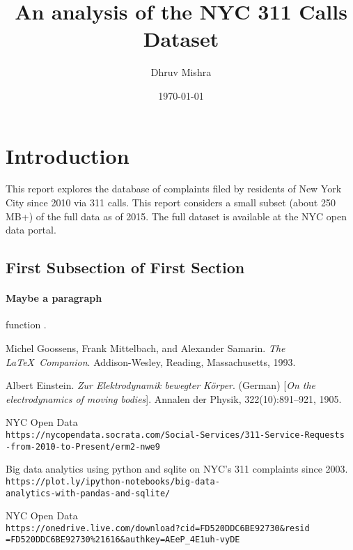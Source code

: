 \documentclass[12pt,a4paper]{article}
\begin{document}
\title{An analysis of the NYC 311 Calls Dataset}
\author{Dhruv Mishra}
\date{\today}

\maketitle


\vspace{+10mm}
\tableofcontents


\vspace{+10mm}
\section{Introduction}
This report explores the database of complaints filed by residents of New York City since 2010 via 311 calls. This report considers a small subset (about 250 MB+) of the full data as of 2015. The full dataset is available at the NYC open data portal\cite{nycdatafull}.
\subsection{First Subsection of First Section}


\paragraph{Maybe a paragraph}
function \cite{nycdatafull}.


\begin{thebibliography}{9}
Michel Goossens, Frank Mittelbach, and Alexander Samarin.
\textit{The \LaTeX\ Companion}.
Addison-Wesley, Reading, Massachusetts, 1993.

Albert Einstein.
\textit{Zur Elektrodynamik bewegter K{\"o}rper}. (German)
[\textit{On the electrodynamics of moving bodies}].
Annalen der Physik, 322(10):891–921, 1905.

NYC Open Data
\\\texttt{https://nycopendata.socrata.com/Social-Services/311-Service-Requests\\-from-2010-to-Present/erm2-nwe9}


Big data analytics using python and sqlite on NYC's 311 complaints since 2003.
\\\texttt{https://plot.ly/ipython-notebooks/big-data-\\analytics-with-pandas-and-sqlite/}

NYC Open Data
\\\texttt{https://onedrive.live.com/download?cid=FD520DDC6BE92730\&resid\\=FD520DDC6BE92730\%21616\&authkey=AEeP\_4E1uh-vyDE}


\end{thebibliography}
\end{document}
